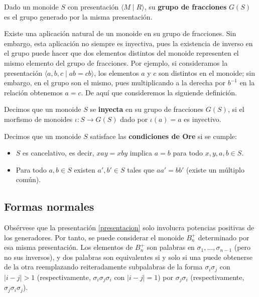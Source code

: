 \documentclass[bibtex, anon]{TEMat-article}
\begin{document}
\begin{definicion}
	Dado un monoide $S$ con presentación $\langle M\mid R\rangle$, su \textbf{grupo de fracciones} $G(S)$ es el grupo generado por la misma presentación.
\end{definicion}

Existe una aplicación natural de un monoide en su grupo de fracciones. Sin embargo, esta aplicación no siempre es inyectiva, pues la existencia de inverso en el grupo puede hacer que dos elementos distintos del monoide representen el mismo elemento del grupo de fracciones. Por ejemplo, si consideramos la presentación $\langle a,b,c\mid ab=cb\rangle$, los elementos $a$ y $c$ son distintos en el monoide; sin embargo, en el grupo son el mismo, pues multiplicando a la derecha por $b^{-1}$ en la relación obtenemos $a=c$. De aquí que consideremos la siguiende definición.

\begin{definicion}
	Decimos que un monoide $S$ se \textbf{inyecta} en su grupo de fracciones $G(S)$, si el morfismo de monoides $\iota: S\to G(S)$ dado por $\iota(a)=a$ es inyectivo.
\end{definicion}

\begin{definicion}\label{condiciones}
	Decimos que un monoide $S$ satisface las \textbf{condiciones de Ore} \cite{Ore} si se cumple:
	\begin{itemize}
		\item $S$ es cancelativo, es decir, $xay=xby$ implica $a=b$ para todo $x,y,a,b\in S$. 
		\item Para todo $a,b\in S$ existen $a',b'\in S$ tales que $aa'=bb'$ (existe un múltiplo común). 
	\end{itemize}
\end{definicion}
\subsection{Formas normales}

Obsérvese que la presentación \ref{presentacion} solo involucra potencias positivas de los generadores. Por tanto, se puede considerar el monoide $B_n^+$ determinado por esa misma presentación. Los elementos de $B_n^+$ son palabras en $\sigma_1,\dots,\sigma_{n-1}$ (pero no sus inversos), y dos palabras son equivalentes si y solo si una puede obtenerse de la otra reemplazando reiteradamente subpalabras de la forma $\sigma_i\sigma_j$ con $|i-j|>1$ (respectivamente, $\sigma_i\sigma_j\sigma_i$ con $|i-j|=1$) por $\sigma_j\sigma_i$ (respectivamente, $\sigma_j\sigma_i\sigma_j$).
\end{document}
